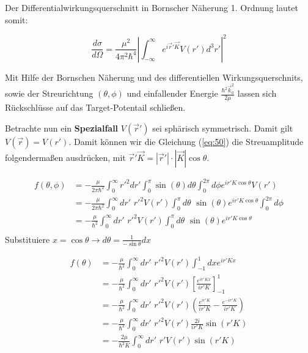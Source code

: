 Der Differentialwirkungsquerschnitt in Bornscher Näherung 1. Ordnung lautet somit:

\begin{equation}
  \label{eq:50}
\boxed{  \frac{d\sigma}{d\Omega}=  \frac{\mu^2}{4\pi^2\hbar^4} \left| \int_{-\infty}^\infty e^{i\vec r'\vec K}  V(r')  d^3 r' \right|^2 }
\end{equation}


Mit Hilfe der Bornschen Näherung und des differentiellen Wirkungsquerschnits, sowie der Streurichtung \((\theta,\phi)\) und einfallender Energie \( \frac{\hbar^2\vec k_0^2}{2\mu} \) lassen sich Rückschlüsse auf das Target-Potentail schließen.


Betrachte nun ein \textbf{Spezialfall} \(V(\vec r')\) sei sphärisch symmetrisch. Damit gilt \(V(\vec r) = V(r')\). Damit können wir die Gleichung (\ref{eq:50}) die Streuamplitude folgendermaßen ausdrücken, mit \(\vec r'\vec K = |\vec r'|\cdot|\vec K|\cos\theta\). 

\begin{align}
  \label{eq:51}
   f(\theta,\phi) &=  - \frac{\mu}{2\pi\hbar^2} \int_0^\infty r'^2dr' \int_0^\pi \sin(\theta)d\theta \int_0^{2\pi}d\phi e^{ir'K\cos\theta}  V(r') \\
&= -\frac{\mu}{2\pi\hbar^2} \int_0^\infty dr'\,\, r'^2  V(r') \int_0^\pi d\theta\,\, \sin(\theta)  e^{ir'K\cos\theta} \int_0^{2\pi}d\phi  \\
&=- \frac{\mu}{\hbar^2} \int_0^\infty dr'\,\, r'^2  V(r') \int_0^\pi d\theta\,\, \sin(\theta)  e^{ir'K\cos\theta}  \\
\end{align}
Substituiere \(x=\cos\theta\rightarrow d\theta = \frac{1}{-\sin\theta}  dx \)

\begin{align}
  \label{eq:52}
   f(\theta) &= - \frac{\mu}{\hbar^2} \int_0^\infty dr'\,\, r'^2  V(r') \int^1_{-1} dx  e^{ir'K x} \\
&=- \frac{\mu}{\hbar^2} \int_0^\infty dr'\,\, r'^2  V(r') \left[ \frac{e^{ir'K x} }{ir'K} \right]^1_{-1}  \\
&=- \frac{\mu}{\hbar^2} \int_0^\infty dr'\,\, r'^2  V(r') \left( \frac{e^{ir'K} }{ir'K}- \frac{e^{-ir'K} }{ir'K} \right)  \\
&=- \frac{\mu}{\hbar^2} \int_0^\infty dr'\,\, r'^2  V(r') \frac{2i}{ir'K} \sin(r'K)  \\
&=- \frac{2\mu}{\hbar^2 K} \int_0^\infty dr'\,\, r'  V(r') \sin(r'K) 
\end{align}

